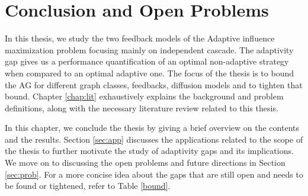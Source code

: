 
\chapter{Conclusion and Open Problems}\label{chap:proposal}


In this thesis, we study the two feedback models of the Adaptive influence maximization problem focusing mainly on independent cascade. The adaptivity gap gives us a performance quantification of an optimal non-adaptive strategy when compared to an optimal adaptive one. The focus of the thesis is to bound the AG for different graph classes, feedbacks, diffusion models and to tighten that bound. Chapter \ref{chap:lit} exhaustively explains the background and problem definitions, along with the necessary literature review related to this thesis.

In this chapter, we conclude the thesis by giving a brief overview on the contents and the results. Section \ref{sec:app} discusses the applications related to the scope of the thesis to further motivate the study of adaptivity gaps and its implications. We move on to discussing the open problems and future directions in Section \ref{sec:prob}. For a more concise idea about the gaps that are still open and needs to be found or tightened, refer to Table \ref{bound}.


